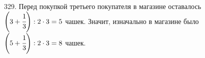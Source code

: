 329. Перед покупкой третьего покупателя в магазине оставалось $\left(3+\cfrac{1}{3}\right):2\cdot3=5$ чашек. Значит, изначально в магазине было $\left(5+\cfrac{1}{3}\right):2\cdot3=8$ чашек.\\
